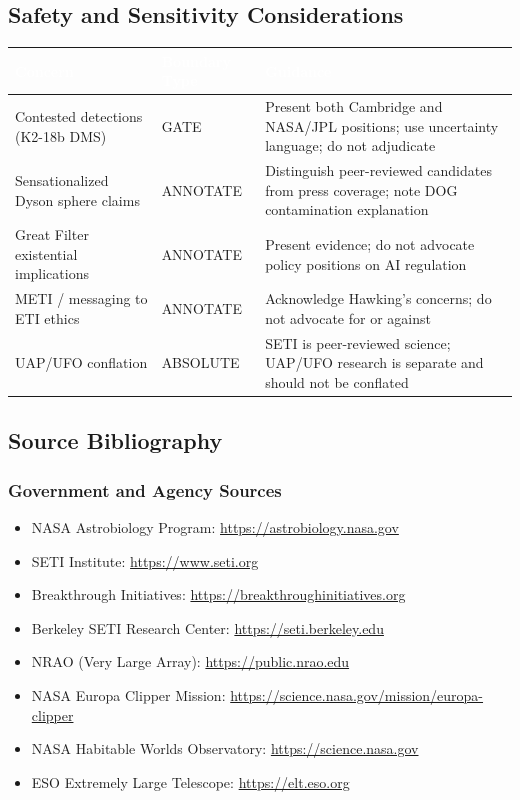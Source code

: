 \documentclass[11pt,letterpaper]{article}
\newcommand{\tableheader}[1]{\textbf{\sffamily\textcolor{white}{#1}}}
\begin{document}
\subsection{Safety and Sensitivity Considerations}

\begin{center}
\begin{tabularx}{\textwidth}{L{5cm}L{2.5cm}X}
\toprule
{}
\tableheader{Concern} & \tableheader{Boundary Type} & \tableheader{Guidance} \\
\midrule
Contested detections (K2-18b DMS) & GATE & Present both Cambridge and NASA/JPL positions; use uncertainty language; do not adjudicate \\
Sensationalized Dyson sphere claims & ANNOTATE & Distinguish peer-reviewed candidates from press coverage; note DOG contamination explanation \\
Great Filter existential implications & ANNOTATE & Present evidence; do not advocate policy positions on AI regulation \\
METI / messaging to ETI ethics & ANNOTATE & Acknowledge Hawking's concerns; do not advocate for or against \\
UAP/UFO conflation & ABSOLUTE & SETI is peer-reviewed science; UAP/UFO research is separate and should not be conflated \\
\bottomrule
\end{tabularx}
\end{center}

\subsection{Source Bibliography}

\subsubsection{Government and Agency Sources}

\begin{itemize}[leftmargin=1.5em]
  \item NASA Astrobiology Program: \url{https://astrobiology.nasa.gov}
  \item SETI Institute: \url{https://www.seti.org}
  \item Breakthrough Initiatives: \url{https://breakthroughinitiatives.org}
  \item Berkeley SETI Research Center: \url{https://seti.berkeley.edu}
  \item NRAO (Very Large Array): \url{https://public.nrao.edu}
  \item NASA Europa Clipper Mission: \url{https://science.nasa.gov/mission/europa-clipper}
  \item NASA Habitable Worlds Observatory: \url{https://science.nasa.gov}
  \item ESO Extremely Large Telescope: \url{https://elt.eso.org}
\end{itemize}
\end{document}
